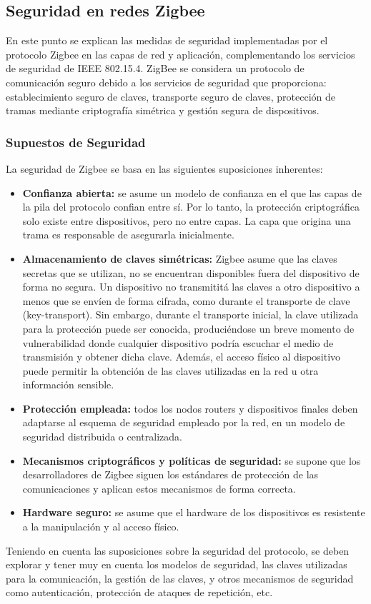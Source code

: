 \subsection{Seguridad en redes Zigbee} %
En este punto se explican las medidas de seguridad implementadas por el protocolo Zigbee en las capas de red y aplicación, complementando los servicios de seguridad de IEEE 802.15.4. ZigBee se considera un protocolo de comunicación seguro debido a los servicios de seguridad que proporciona: establecimiento seguro de claves, transporte seguro de claves, protección de tramas mediante criptografía simétrica y gestión segura de dispositivos.
\subsubsection{Supuestos de Seguridad} %
La seguridad de Zigbee se basa en las siguientes suposiciones inherentes:
\begin{itemize}
\item{\bf Confianza abierta:} se asume un modelo de confianza en el que las capas de la pila del protocolo confian entre sí. Por lo tanto, la protección criptográfica solo existe entre dispositivos, pero no entre capas. La capa que origina una trama es responsable de asegurarla inicialmente.
\item{\bf Almacenamiento de claves simétricas:} Zigbee asume que las claves secretas que se utilizan, no se encuentran disponibles fuera del dispositivo de forma no segura. Un dispositivo no transmititá las claves a otro dispositivo a menos que se envíen de forma cifrada, como durante el transporte de clave (key-transport). Sin embargo, durante el transporte inicial, la clave utilizada para la protección puede ser conocida, produciéndose un breve momento de vulnerabilidad donde cualquier dispositivo podría escuchar el medio de transmisión y obtener dicha clave. Además, el acceso físico al dispositivo puede permitir la obtención de las claves utilizadas en la red u otra información sensible.
\item{\bf Protección empleada:} todos los nodos routers y dispositivos finales deben adaptarse al esquema de seguridad empleado por la red, en un modelo de seguridad distribuida o centralizada.
\item{\bf Mecanismos criptográficos y políticas de seguridad:} se supone que los desarrolladores de Zigbee siguen los estándares de protección de las comunicaciones y aplican estos mecanismos de forma correcta.
\item{\bf Hardware seguro:} se asume que el hardware de los dispositivos es resistente a la manipulación y al acceso físico.
\end{itemize}
Teniendo en cuenta las suposiciones sobre la seguridad del protocolo, se deben explorar y tener muy en cuenta los modelos de seguridad, las claves utilizadas para la comunicación, la gestión de las claves, y otros mecanismos de seguridad como autenticación, protección de ataques de repetición, etc.
\clearpage




